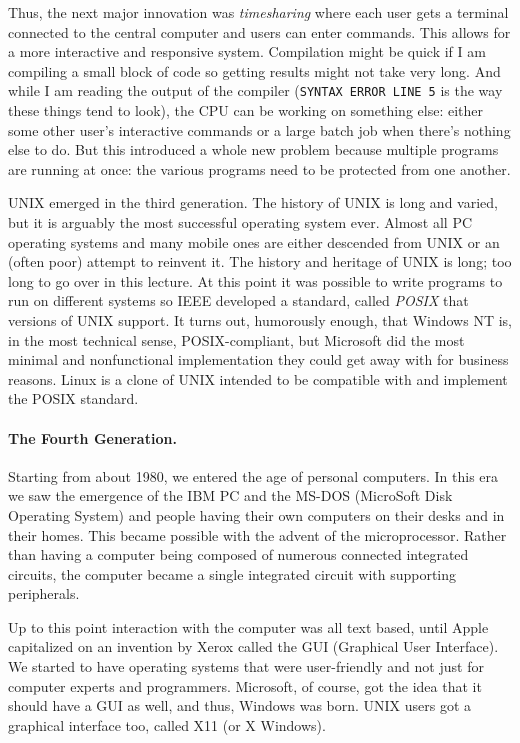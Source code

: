 Thus, the next major innovation was \textit{timesharing} where each user gets a terminal connected to the central computer and users can enter commands. This allows for a more interactive and responsive system. Compilation might be quick if I am compiling a small block of code so getting results might not take very long. And while I am reading the output of the compiler (\texttt{SYNTAX ERROR LINE 5} is the way these things tend to look), the CPU can be working on something else: either some other user's interactive commands or a large batch job when there's nothing else to do. But this introduced a whole new problem because multiple programs are running at once: the various programs need to be protected from one another.

UNIX emerged in the third generation. The history of UNIX is long and varied, but it is arguably the most successful operating system ever. Almost all PC operating systems and many mobile ones are either descended from UNIX or an (often poor) attempt to reinvent it. The history and heritage of UNIX is long; too long to go over in this lecture. At this point it was possible to write programs to run on different systems so IEEE developed a standard, called \textit{POSIX} that versions of UNIX support. It turns out, humorously enough, that Windows NT is, in the most technical sense, POSIX-compliant, but Microsoft did the most minimal and nonfunctional implementation they could get away with for business reasons. Linux is a clone of UNIX intended to be compatible with and implement the POSIX standard.

\paragraph{The Fourth Generation.} Starting from about 1980, we entered the age of personal computers. In this era we saw the emergence of the IBM PC and the MS-DOS (MicroSoft Disk Operating System) and people having their own computers on their desks and in their homes. This became possible with the advent of the microprocessor. Rather than having a computer being composed of numerous connected integrated circuits, the computer became a single integrated circuit with supporting peripherals.

Up to this point interaction with the computer was all text based, until Apple capitalized on an invention by Xerox called the GUI (Graphical User Interface). We started to have operating systems that were user-friendly and not just for computer experts and programmers. Microsoft, of course, got the idea that it should have a GUI as well, and thus, Windows was born. UNIX users got a graphical interface too, called X11 (or X Windows). 

